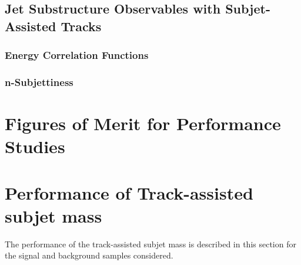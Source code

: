 \documentclass[UKenglish,texlive=2013]{\ATLASLATEXPATH atlasdoc}
\begin{document}











\subsection{Jet Substructure Observables with Subjet-Assisted Tracks}\label{sec:tas_jss}



\subsubsection{Energy Correlation Functions}\label{subsec:ECF}


\subsubsection{n-Subjettiness}\label{subsec:nSub}


\clearpage
\section{Figures of Merit for Performance Studies}\label{sec:FoM}


\clearpage
\section{Performance of Track-assisted subjet mass}
\label{sec:mtas}
The performance of the track-assisted subjet mass is described in this section for the signal and background samples considered.

\clearpage
\end{document}
